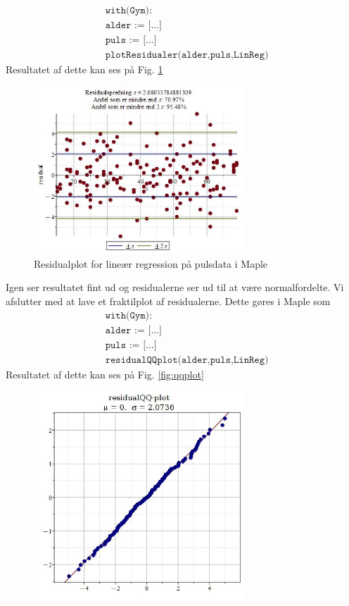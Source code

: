 \begin{exa}
	\begin{align*}
		&\texttt{with(Gym):}\\
		&\texttt{alder := [...]}\\
		&\texttt{puls := [...]}\\
		&\texttt{plotResidualer(alder,puls,LinReg)}
	\end{align*}
	Resultatet af dette kan ses på Fig. \ref{fig:linres}
	\begin{figure}[H]
		\centering
		\includegraphics[width=0.7\textwidth]{Billeder/linrespuls.jpg}
		\caption{Residualplot for lineær regression på pulsdata i Maple}
		\label{fig:linres}
	\end{figure}
	Igen ser resultatet fint ud og residualerne ser ud til at være normalfordelte. Vi afslutter med at lave et fraktilplot af residualerne. Dette gøres i Maple som
	\begin{align*}
		&\texttt{with(Gym):}\\
		&\texttt{alder := [...]}\\
		&\texttt{puls := [...]}\\
		&\texttt{residualQQplot(alder,puls,LinReg)}
	\end{align*}
	Resultatet af dette kan ses på Fig. \ref{fig:qqplot}
	\begin{figure}[H]
		\centering
		\includegraphics[width=0.7\textwidth]{Billeder/qqplotpuls.jpg}

\end{figure}
\end{exa}
